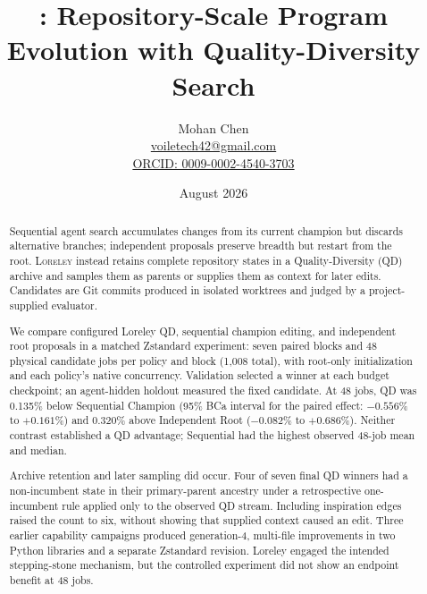 \documentclass[10pt,twocolumn]{article}
\title{\vspace{-0.6em}\system: Repository-Scale Program Evolution with Quality-Diversity Search}
\author{Mohan Chen\\
\href{mailto:voiletech42@gmail.com}{voiletech42@gmail.com}\\
\href{https://orcid.org/0009-0002-4540-3703}{ORCID: 0009-0002-4540-3703}}
\date{August 2026}
\newcommand{\system}{\textsc{Loreley}\xspace}
\begin{document}
\maketitle
\vspace{-1.2em}

\begin{abstract}
Sequential agent search accumulates changes from its current champion but
discards alternative branches; independent proposals preserve breadth but
restart from the root. \system instead retains complete repository states in a
Quality-Diversity (QD) archive and samples them as parents or supplies them as
context for later edits. Candidates are Git commits produced in isolated
worktrees and judged by a project-supplied evaluator.

We compare configured Loreley QD, sequential champion editing, and independent
root proposals in a matched Zstandard experiment: seven paired blocks and 48
physical candidate jobs per policy and block (1,008 total), with root-only
initialization and each policy's native concurrency. Validation selected a
winner at each budget checkpoint; an agent-hidden holdout measured the fixed
candidate. At 48 jobs, QD was 0.135\% below Sequential Champion (95\% BCa
interval for the paired effect: $-0.556$\% to $+0.161$\%) and 0.320\% above
Independent Root ($-0.082$\% to $+0.686$\%). Neither contrast established a QD
advantage; Sequential had the highest observed 48-job mean and median.

Archive retention and later sampling did occur. Four of seven final QD winners
had a non-incumbent state in their primary-parent ancestry under a
retrospective one-incumbent rule applied only to the observed QD stream.
Including inspiration edges raised the count to six, without showing that
supplied context caused an edit. Three earlier capability campaigns produced
generation-4, multi-file improvements in two Python libraries and a separate
Zstandard revision. Loreley engaged the intended stepping-stone mechanism, but
the controlled experiment did not show an endpoint benefit at 48 jobs.
\end{abstract}
\end{document}
